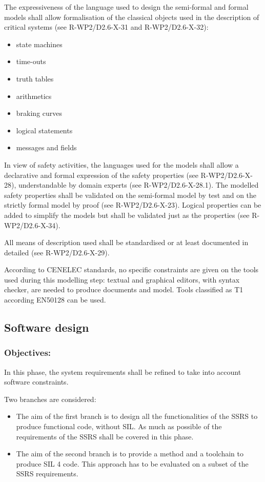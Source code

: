 The expressiveness of the language used to design the semi-formal and formal models shall allow formalisation of the classical objects used in the description of critical systems (see R-WP2/D2.6-X-31 and R-WP2/D2.6-X-32):

\begin{itemize}
\item state machines
\item time-outs
\item truth tables
\item arithmetics
\item braking curves
\item logical statements
\item messages and fields
\end{itemize}


In view of safety activities, the languages used for the models shall allow a declarative and formal expression of the safety properties (see R-WP2/D2.6-X-28), understandable by domain experts (see R-WP2/D2.6-X-28.1). The modelled safety properties shall be validated on the semi-formal model by test and on the strictly formal model by proof (see R-WP2/D2.6-X-23). Logical properties can be added to simplify the models but shall be validated just as the properties (see R-WP2/D2.6-X-34).

All means of description used shall be standardised or at least documented in detailed (see R-WP2/D2.6-X-29). 

According to  CENELEC standards, no specific constraints are given on the tools used during this modelling step: textual and graphical editors, with syntax checker, are needed to  produce documents and model. Tools classified as T1 according EN50128 can be used.



\subsection{Software design}
\label{sec:sw-design}

\subsubsection{Objectives:}
\label{sec:sw-req-objective}


In this phase, the system requirements shall be refined to take into account software constraints.

Two branches are considered:
\begin{itemize}
\item  The aim of the first branch  is to  design all the functionalities of the SSRS to  produce functional code, without SIL. As much as possible of the requirements of the SSRS shall be covered in this phase.
\item The aim  of the second branch is to provide a method and a toolchain to produce SIL 4 code. This approach has to be evaluated on a subset of the SSRS requirements.
\end{itemize}


